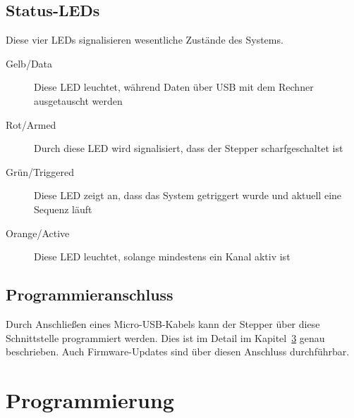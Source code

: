 \documentclass[paper=a4, open=any]{scrbook}
\begin{document}
		\section{Status-LEDs}
			Diese vier LEDs signalisieren wesentliche Zustände des Systems.
			\begin{description}
				\item[Gelb/Data] Diese LED leuchtet, während Daten über USB mit dem Rechner ausgetauscht werden
				\item[Rot/Armed] Durch diese LED wird signalisiert, dass der Stepper scharfgeschaltet ist
				\item[Grün/Triggered] Diese LED zeigt an, dass das System getriggert wurde und aktuell eine Sequenz läuft
				\item[Orange/Active] Diese LED leuchtet, solange mindestens ein Kanal aktiv ist
			\end{description}

		\section{Programmieranschluss}
			Durch Anschließen eines Micro-USB-Kabels kann der Stepper über diese Schnittstelle programmiert werden. Dies ist im Detail im Kapitel~\ref{sec:gui} genau beschrieben. Auch Firmware-Updates sind über diesen Anschluss durchführbar.

	\chapter{Programmierung}
		\label{sec:gui}
\end{document}
